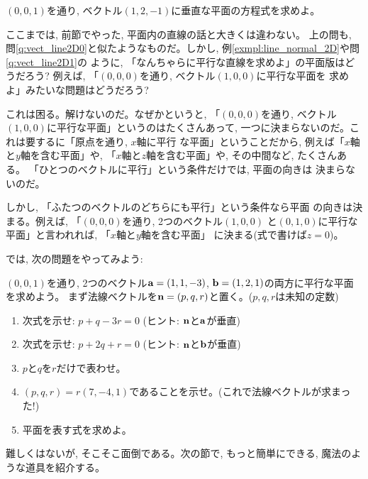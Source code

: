 \begin{q}\label{q:vect_3D1}
$(0, 0, 1)$を通り, ベクトル$(1, 2, -1)$に垂直な平面の方程式を求めよ。
\end{q}
\hv

ここまでは, 前節でやった, 平面内の直線の話と大きくは違わない。
上の問も, 問\ref{q:vect_line2D0}と似たようなものだ。しかし, 
例\ref{exmpl:line_normal_2D}や問\ref{q:vect_line2D1}の
ように, 「なんちゃらに平行な直線を求めよ」の平面版はどうだろう?
例えば, 「$(0,0,0)$を通り, ベクトル$(1,0,0)$に平行な平面を
求めよ」みたいな問題はどうだろう?

これは困る。解けないのだ。なぜかというと, 「$(0,0,0)$を通り, 
ベクトル$(1,0,0)$に平行な平面」というのはたくさんあって, 
一つに決まらないのだ。これは要するに「原点を通り, $x$軸に平行
な平面」ということだから, 例えば「$x$軸と$y$軸を含む平面」や, 
「$x$軸と$z$軸を含む平面」や, その中間など, たくさんある。
「ひとつのベクトルに平行」という条件だけでは, 平面の向きは
決まらないのだ。

しかし, 「ふたつのベクトルのどちらにも平行」という条件なら平面
の向きは決まる。例えば, 「$(0,0,0)$を通り, 2つのベクトル$(1,0,0)$
と$(0,1,0)$に平行な平面」と言われれば, 「$x$軸と$y$軸を含む平面」
に決まる(式で書けば$z=0$)。

では, 次の問題をやってみよう:

\begin{q}\label{q:vect_3D_2vecpara_plane}
$(0,0,1)$を通り, 2つのベクトル${\bf a}=(1, 1, -3)$, 
${\bf b}=(1, 2, 1)$の両方に平行な平面を求めよう。
まず法線ベクトルを${\bf n}=(p, q, r)$と置く。($p, q, r$は未知の定数)
\begin{enumerate}
\item 次式を示せ: $p+q-3r=0$ (ヒント: ${\bf n}$と${\bf a}$が垂直)
\item 次式を示せ: $p+2q+r=0$ (ヒント: ${\bf n}$と${\bf b}$が垂直)
\item $p$と$q$を$r$だけで表わせ。
\item $(p, q, r)=r(7, -4, 1)$であることを示せ。(これで法線ベクトルが求まった!)
\item 平面を表す式を求めよ。
\end{enumerate}
\end{q}

難しくはないが, そこそこ面倒である。次の節で, もっと簡単にできる, 
魔法のような道具を紹介する。
\vv


